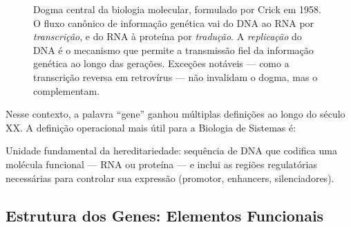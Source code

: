 \begin{figure}[htbp]
\centering
{}
\caption{Dogma central da biologia molecular, formulado por Crick em 1958. O fluxo canônico de informação genética vai do DNA ao RNA por \emph{transcrição}, e do RNA à proteína por \emph{tradução}. A \emph{replicação} do DNA é o mecanismo que permite a transmissão fiel da informação genética ao longo das gerações. Exceções notáveis --- como a transcrição reversa em retrovírus --- não invalidam o dogma, mas o complementam.}
\label{fig:06-dogma}
\end{figure}

Nesse contexto, a palavra ``gene'' ganhou múltiplas definições ao longo do século XX. A
definição operacional mais útil para a Biologia de Sistemas é:

\begin{definicaoenv}[Gene]
Unidade fundamental da hereditariedade: sequência de DNA que codifica uma molécula
funcional --- RNA ou proteína --- e inclui as regiões regulatórias necessárias para
controlar sua expressão (promotor, enhancers, silenciadores).
\end{definicaoenv}

\subsection{Estrutura dos Genes: Elementos Funcionais}

